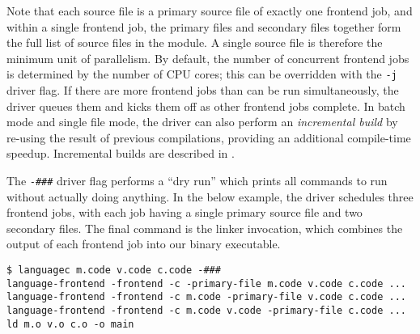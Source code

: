 \documentclass[../generics]{subfiles}
\begin{document}
Note that each source file is a primary source file of exactly one frontend job, and within a single frontend job, the primary files and secondary files together form the full list of source files in the module. A single source file is therefore the minimum unit of parallelism. By default, the number of concurrent frontend jobs is determined by the number of CPU cores; this can be overridden with the \texttt{-j} driver flag. If there are more frontend jobs than can be run simultaneously, the driver queues them and kicks them off as other frontend jobs complete. In batch mode and single file mode, the driver can also perform an \emph{incremental build} by re-using the result of previous compilations, providing an additional compile-time speedup. Incremental builds are described in .

The \verb|-###| driver flag performs a ``dry run'' which prints all commands to run without actually doing anything. In the below example, the driver schedules three frontend jobs, with each job having a single primary source file and two secondary files. The final command is the linker invocation, which combines the output of each frontend job into our binary executable.
\begin{Verbatim}
$ languagec m.code v.code c.code -###
language-frontend -frontend -c -primary-file m.code v.code c.code ...
language-frontend -frontend -c m.code -primary-file v.code c.code ...
language-frontend -frontend -c m.code v.code -primary-file c.code ...
ld m.o v.o c.o -o main
\end{Verbatim}
\end{document}

